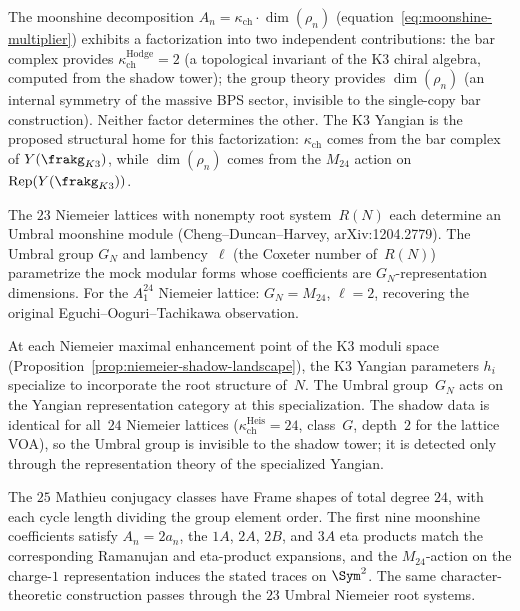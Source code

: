 \begin{remark}
\label{rem:bar-m24-orthogonality}
The moonshine decomposition
$A_n = \kappa_{\mathrm{ch}} \cdot \dim(\rho_n)$
(equation~\eqref{eq:moonshine-multiplier})
exhibits a factorization into two independent contributions:
the bar complex provides $\kappa_{\mathrm{ch}}^{\mathrm{Hodge}} = 2$ (a
topological invariant of the K3 chiral algebra, computed from the
shadow tower); the group theory provides $\dim(\rho_n)$ (an
internal symmetry of the massive BPS sector, invisible to the
single-copy bar construction). Neither factor determines the
other. The K3 Yangian is the proposed structural home for
this factorization: $\kappa_{\mathrm{ch}}$ comes from the bar
complex of $Y(\frakg_{K3})$, while $\dim(\rho_n)$ comes from
the $M_{24}$ action on $\mathrm{Rep}(Y(\frakg_{K3}))$.
\end{remark}

\begin{remark}
\label{rem:umbral-yangian}
The $23$ Niemeier lattices with nonempty root system~$R(N)$
each determine an Umbral moonshine module
(Cheng--Duncan--Harvey, arXiv:1204.2779).
The Umbral group $G_N$ and lambency~$\ell$ (the Coxeter number
of~$R(N)$) parametrize the mock modular forms whose
coefficients are $G_N$-representation dimensions. For the
$A_1^{24}$ Niemeier lattice: $G_N = M_{24}$, $\ell = 2$,
recovering the original Eguchi--Ooguri--Tachikawa observation.

At each Niemeier maximal enhancement point of the K3 moduli
space (Proposition~\ref{prop:niemeier-shadow-landscape}),
the K3 Yangian parameters $h_i$ specialize to incorporate the
root structure of~$N$. The Umbral group~$G_N$ acts on the
Yangian representation category at this specialization.
The shadow data is identical for all~$24$ Niemeier lattices
($\kappa_{\mathrm{ch}}^{\mathrm{Heis}} = 24$, class~$G$, depth~$2$ for the
lattice VOA), so the Umbral group is invisible to the shadow
tower; it is detected only through the representation theory
of the specialized Yangian.
\end{remark}
The \(25\) Mathieu conjugacy classes have Frame shapes of total degree
\(24\), with each cycle length dividing the group element order. The
first nine moonshine coefficients satisfy \(A_n=2a_n\), the \(1A\),
\(2A\), \(2B\), and \(3A\) eta products match the corresponding
Ramanujan and eta-product expansions, and the \(M_{24}\)-action on
the charge-\(1\) representation induces the stated traces on
\(\Sym^2\). The same character-theoretic construction passes through
the \(23\) Umbral Niemeier root systems.

